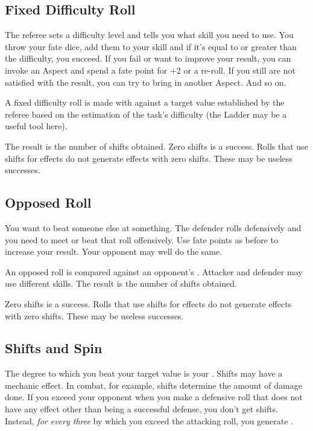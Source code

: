 \subsection{Fixed Difficulty Roll}
\label{sec:fixed-difficulty-roll}

The referee sets a difficulty level and tells you what skill you need to use. You throw your fate dice, add them to your skill and if it's equal to or greater than the difficulty, you succeed. If you fail or want to improve your result, you can invoke an Aspect and spend a fate point for +2 or a re-roll. If you still are not satisfied with the result, you can try to bring in another Aspect. And so on.

A fixed difficulty roll is made with \dplusskill{} against a target value established by the referee based on the estimation of the task's difficulty (the Ladder may be a useful tool here).

The result is the number of shifts obtained.  Zero shifts is a success. Rolls that use shifts for effects do not generate effects with zero shifts. These may be useless successes.


\subsection{Opposed Roll}
\label{sec:opposed-roll}

You want to beat someone else at something. The defender rolls defensively and 
you need to meet or beat that roll offensively. Use fate points as before to 
increase your result. Your opponent may well do the same.

An opposed roll is \dplusskill{} compared against an opponent's \dplusskill. 
Attacker and defender may use different skills. The result is the number of 
shifts obtained.

Zero shifts is a success. Rolls that use shifts for effects do not generate 
effects with zero shifts. These may be useless successes.

\subsection{Shifts and Spin}
\label{sec:shifts-and-spin}



The degree to which you beat your target value is your . Shifts 
may have a mechanic effect. In combat, for example, shifts determine the amount 
of damage done. If you exceed your opponent when you make a defensive roll that 
does not have any effect other than being a successful defense, you don't get 
shifts. Instead, \emph{for every three} by which you exceed the attacking roll, 
you generate .

